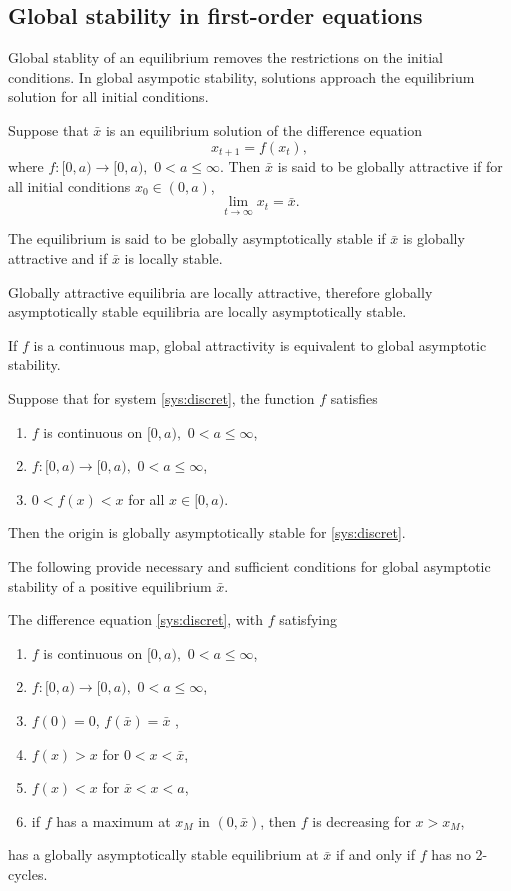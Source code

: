 \subsection{Global stability in first-order equations}
Global stablity of an equilibrium removes the restrictions on the initial conditions. In global asympotic stability, solutions approach the equilibrium solution for all initial conditions. 


\begin{definition}
Suppose that $\bar x$ is an equilibrium solution of the difference equation $$x_{t+1}=f(x_t),$$
where $f: [0,a)\rightarrow [0,a),$ $0<a\leq \infty$. Then $\bar x$ is said to be globally attractive if for all initial conditions $x_0\in (0,a)$, $$\lim_{t\rightarrow \infty}x_t=\bar x.$$

The equilibrium is said to be globally asymptotically stable if $\bar x$ is globally attractive and if $\bar x$ is locally stable.
\end{definition}
Globally attractive equilibria are locally attractive, therefore globally asymptotically stable equilibria are locally asymptotically stable.




If $f$ is a continuous map, global attractivity is equivalent to global asymptotic stability.
\begin{theorem}\label{th:gas_1}
Suppose that for system \eqref{sys:discret}, the function $f$ satisfies
\begin{enumerate}
\item $f$ is continuous on $[0,a),$ $0<a\leq \infty$,
\item $f: [0,a)\rightarrow [0,a),$ $0<a\leq \infty$,
\item $0<f(x)<x$ for all $x\in [0,a)$.
\end{enumerate}
Then the origin is globally asymptotically stable for \eqref{sys:discret}.
\end{theorem}



The following provide necessary and sufficient conditions for global asymptotic stability of a positive equilibrium $\bar x$.
\begin{theorem}\label{th:gas_2}
The difference equation \eqref{sys:discret}, with $f$ satisfying 
\begin{enumerate}
\item $f$ is continuous on $[0,a),$ $0<a\leq \infty$,
\item $f: [0,a)\rightarrow [0,a),$ $0<a\leq \infty$,
\item $f(0)=0$, $f(\bar x)=\bar x$ ,
\item $f(x)>x$ for $0<x<\bar x$,
\item $f(x)<x$ for $\bar x<x<a$,
\item if $f$ has a maximum at $x_M$ in $(0,\bar x)$, then $f$ is decreasing for $x>x_M$,
\end{enumerate}
has a globally asymptotically stable equilibrium at $\bar x$ if and only if $f$ has no 2-cycles.
\end{theorem}

